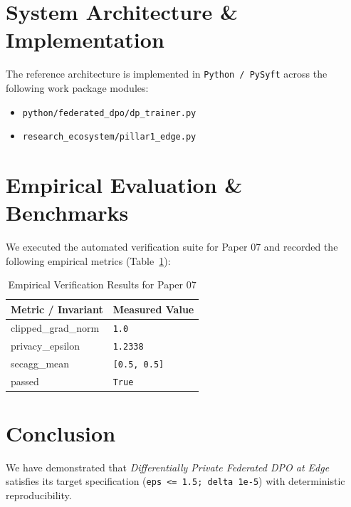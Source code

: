 \documentclass[10pt,twocolumn]{article}
\begin{document}
\section{System Architecture \& Implementation}
The reference architecture is implemented in \texttt{Python / PySyft} across the following work package modules:
\begin{itemize}
  \item \texttt{python/federated\_dpo/dp\_trainer.py}
  \item \texttt{research\_ecosystem/pillar1\_edge.py}
\end{itemize}

\section{Empirical Evaluation \& Benchmarks}
We executed the automated verification suite for Paper 07 and recorded the following empirical metrics (Table~\ref{tab:metrics}):

\begin{table}[htbp]
\centering
\caption{Empirical Verification Results for Paper 07}
\label{tab:metrics}
\begin{tabular}{ll}
\toprule
\textbf{Metric / Invariant} & \textbf{Measured Value} \\
\midrule
    clipped\_grad\_norm & \texttt{1.0} \\
    privacy\_epsilon & \texttt{1.2338} \\
    secagg\_mean & \texttt{[0.5, 0.5]} \\
    passed & \texttt{True} \\
\bottomrule
\end{tabular}
\end{table}

\section{Conclusion}
We have demonstrated that \textit{Differentially Private Federated DPO at Edge} satisfies its target specification (\texttt{eps <= 1.5; delta 1e-5}) with deterministic reproducibility.



\end{document}
